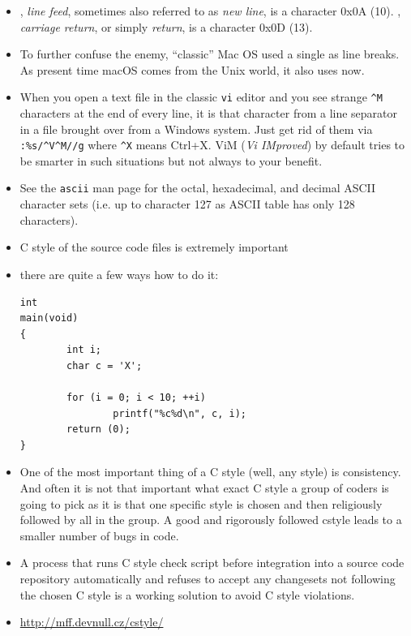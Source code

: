 
\begin{itemize}
\item {}, \emph{line feed}, sometimes also referred to as \emph{new
line}, is a character 0x0A (10).  , \emph{carriage return}, or simply
\emph{return}, is a character 0x0D (13).
\item To further confuse the enemy, ``classic'' Mac OS used a single 
as line breaks.  As present time macOS comes from the Unix world, it also uses
 now.
\item When you open a text file in the classic \texttt{vi} editor and you see
strange \verb|^M| characters at the end of every line, it is that 
character from a line separator in a file brought over from a Windows system.
Just get rid of them via \verb|:%s/^V^M//g| where \verb|^X| means Ctrl+X.
ViM (\emph{Vi IMproved}) by default tries to be smarter in such situations but
not always to your benefit.
\item See the \texttt{ascii} man page for the octal, hexadecimal, and decimal
ASCII character sets (i.e. up to character 127 as ASCII table has only 128
characters).
\end{itemize}



\begin{slide}
\begin{itemize}
\item C style of the source code files is extremely important
\item there are quite a few ways how to do it:

\begin{verbatim}
int
main(void)
{
        int i;
        char c = 'X';

        for (i = 0; i < 10; ++i)
                printf("%c%d\n", c, i);
        return (0);
}
\end{verbatim}
\end{itemize}
\end{slide}

\begin{itemize}
\item One of the most important thing of a C style (well, any style) is
consistency.  And often it is not that important what exact C style a group
of coders is going to pick as it is that one specific style is chosen and then
religiously followed by all in the group. A good and rigorously followed cstyle
leads to a smaller number of bugs in code.
\item A process that runs C style check script before integration into a source
code repository automatically and refuses to accept any changesets not following
the chosen C style is a working solution to avoid C style violations.
\item \url{http://mff.devnull.cz/cstyle/}
\end{itemize}

